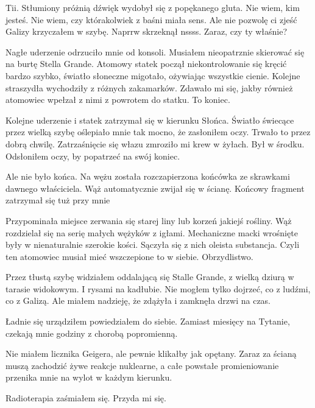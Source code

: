 \begin{dialogue}
	\ds{} Tii. \dm{} Stłumiony próżnią dźwięk wydobył się z popękanego gluta.
	\ds{} Nie wiem, kim jesteś. Nie wiem, czy którakolwiek z baśni miała sens. Ale nie pozwolę ci zjeść Galizy \dm{} krzyczałem w szybę. 
	\ds{} Naprrw \dm{} skrzeknął \dm{} nssss.
	\ds{} Zaraz, czy ty właśnie?
\end{dialogue}

Nagłe uderzenie odrzuciło mnie od konsoli.
Musiałem nieopatrznie skierować się na burtę Stella Grande.
Atomowy statek począł niekontrolowanie się kręcić bardzo szybko, światło słoneczne migotało, ożywiając wszystkie cienie.
Kolejne straszydła wychodziły z różnych zakamarków.
Zdawało mi się, jakby również atomowiec wpełzał z nimi z powrotem do statku.
To koniec.

Kolejne uderzenie i statek zatrzymał się w kierunku Słońca.
Światło świecące przez wielką szybę oślepiało mnie tak mocno, że zasłoniłem oczy.
Trwało to przez dobrą chwilę.
Zatrzaśnięcie się włazu zmroziło mi krew w żyłach. Był w środku. Odsłoniłem oczy, by popatrzeć na swój koniec.

Ale nie było końca.
Na wężu została rozczapierzona końcówka ze skrawkami dawnego właściciela.
Wąż automatycznie zwijał się w ścianę.
Końcowy fragment zatrzymał się tuż przy mnie

Przypominała miejsce zerwania się starej liny lub korzeń jakiejś rośliny.
Wąż rozdzielał się na serię małych wężyków z igłami.
Mechaniczne macki wrośnięte były w nienaturalnie szerokie kości.
Sączyła się z nich oleista substancja.
Czyli ten atomowiec musiał mieć wszczepione to w siebie.
Obrzydlistwo.

Przez tłustą szybę widziałem oddalającą się Stalle Grande, z wielką dziurą w tarasie widokowym.
I rysami na kadłubie.
Nie mogłem tylko dojrzeć, co z ludźmi, co z Galizą.
Ale miałem nadzieję, że zdążyła i zamknęła drzwi na czas.

\begin{dialogue}
	\ds{} Ładnie się urządziłem \dm{} powiedziałem do siebie. \dm{} Zamiast miesięcy na Tytanie, czekają mnie godziny z chorobą popromienną.
\end{dialogue}
Nie miałem licznika Geigera, ale pewnie klikałby jak opętany.
Zaraz za ścianą muszą zachodzić żywe reakcje nuklearne, a całe powstałe promieniowanie przenika mnie na wylot w każdym kierunku.
\begin{dialogue}
	\ds{} Radioterapia \dm{} zaśmiałem się. \dm{} Przyda mi się.
\end{dialogue}

